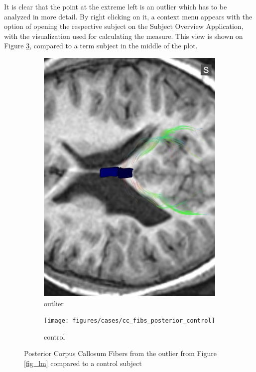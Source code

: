 \documentclass[twocolumn]{svjour3}
\begin{document}
It is clear that the point at the extreme left is an outlier which has to be analyzed in more detail. By right clicking on it, a context menu appears with the option of opening the respective subject on the Subject Overview Application, with the visualization used for calculating the measure. This view is shown on Figure \ref{fig_subject2}, compared to a term subject in the middle of the plot.

\begin{figure}
\begin{center}
\begin{subfigure}[b]{0.48\linewidth}
\includegraphics[width=\textwidth]{figures/cases/cc_fibs_posterior_outlier}
\caption{\label{fig_cc_outlier}outlier}
\end{subfigure}\hfill
\begin{subfigure}[b]{0.48\linewidth}
\texttt{[image: figures/cases/cc\_fibs\_posterior\_control]}
\caption{\label{fig_cc_control}control}
\end{subfigure}
\end{center}
 \caption{\label{fig_subject2} Posterior Corpus Callosum Fibers from the outlier from Figure \ref{fig_lm} compared to a control subject}
\end{figure}
\end{document}
